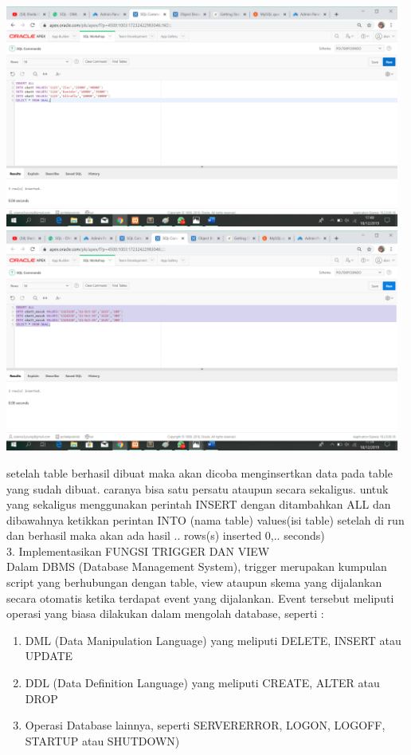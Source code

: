 \documentclass{article}
\begin{document}
\begin{center}
    \includegraphics[width=13cm]{figure/insert1.png}
    \includegraphics[width=13cm]{figure/insert2.png}
\end{center}

setelah table berhasil dibuat maka akan dicoba menginsertkan data pada table yang sudah dibuat. caranya bisa satu persatu ataupun secara sekaligus. untuk yang sekaligus menggunakan perintah INSERT dengan ditambahkan ALL dan dibawahnya ketikkan perintan INTO (nama table) values(isi table) setelah di run dan berhasil maka akan ada hasil .. rows(s) inserted 0,.. seconds)\\

    3. Implementasikan FUNGSI TRIGGER DAN VIEW\\

Dalam DBMS (Database Management System), trigger merupakan kumpulan script yang berhubungan dengan table, view ataupun skema yang dijalankan secara otomatis ketika terdapat event yang dijalankan. Event tersebut meliputi operasi yang biasa dilakukan dalam mengolah database, seperti : 

\begin{enumerate}
    \item DML (Data Manipulation Language) yang meliputi DELETE, INSERT atau UPDATE
    \item DDL (Data Definition Language) yang meliputi CREATE, ALTER atau DROP
    \item Operasi Database lainnya, seperti SERVERERROR, LOGON, LOGOFF, STARTUP atau SHUTDOWN)
\end{enumerate}
\end{document}
